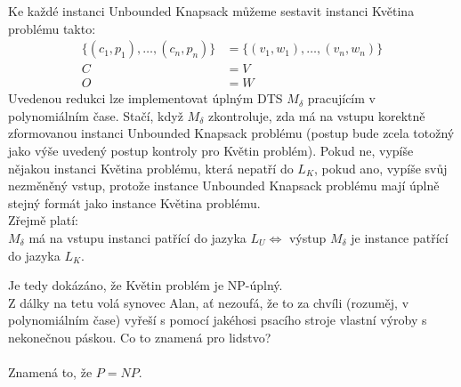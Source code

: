 \documentclass[a4paper,11pt]{article}[24.3.2010]
\begin{document}
\begin{enumerate}
\begin{enumerate}[I/]
Ke každé instanci Unbounded Knapsack můžeme sestavit instanci Květina problému takto:
\begin{align*} 
\{(c_{1},p_{1}),\dots,(c_{n},p_{n})\}&= \{(v_{1},w_{1}),\dots,(v_{n},w_{n})\}\\
C&=V\\
O&=W
\end{align*} 
Uvedenou redukci lze implementovat úplným DTS $M_{\delta}$  pracujícím v polynomiálním čase. Stačí, když $M_{\delta}$ zkontroluje, zda má na vstupu korektně zformovanou instanci Unbounded Knapsack problému (postup bude zcela totožný jako výše uvedený postup kontroly pro Květin problém). Pokud ne, vypíše nějakou instanci Květina problému, která nepatří do $L_{K}$, pokud ano, vypíše svůj nezměněný vstup, protože instance Unbounded Knapsack problému mají úplně stejný formát jako instance Květina problému.\\

Zřejmě platí: \\$M_{\delta}$ má na vstupu instanci patřící do jazyka $L_{U} \Leftrightarrow$ výstup $M_{\delta}$ je instance patřící do jazyka $L_{K}$.

\end{enumerate}

Je tedy dokázáno, že Květin problém je NP-úplný.\\

Z dálky na tetu volá synovec Alan, ať nezoufá, že to za chvíli (rozuměj, v polynomiálním čase) vyřeší s pomocí jakéhosi psacího stroje vlastní výroby s nekonečnou páskou. Co to znamená pro lidstvo?\\\\
Znamená to, že $P=NP$.



\end{enumerate}
\end{document}
